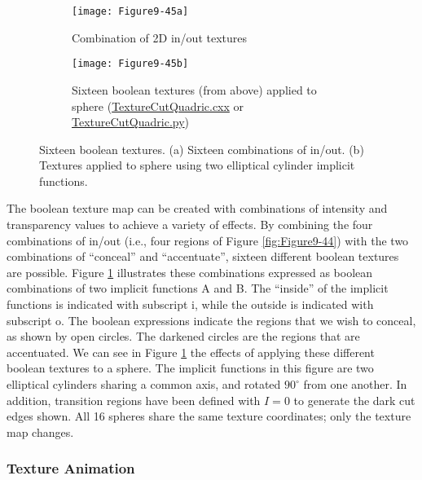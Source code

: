 \begin{figure}[htb]
	\begin{subfigure}[h]{0.75\linewidth}
		\texttt{[image: Figure9-45a]}
		\captionsetup{justification=centering}
		\caption{Combination of 2D in/out textures}
		\label{fig:Figure9-45a}
	\end{subfigure}
	\hfill
	\begin{subfigure}[h]{0.75\linewidth}
		\texttt{[image: Figure9-45b]}
		\captionsetup{justification=centering}
		\caption{Sixteen boolean textures (from above) applied to sphere  (\href{https://lorensen.github.io/VTKExamples/site/Cxx/Texture/TextureCutQuadric/}{TextureCutQuadric.cxx} or \href{https://lorensen.github.io/VTKExamples/site/Python/Texture/TextureCutQuadric/}{TextureCutQuadric.py})}
		\label{fig:Figure9-45b}
	\end{subfigure}
	\caption{Sixteen boolean textures. (a) Sixteen combinations of in/out. (b) Textures applied to sphere using two elliptical cylinder implicit functions.}\label{fig:Figure9-45}
\end{figure}

The boolean texture map can be created with combinations of intensity and transparency values to achieve a variety of effects. By combining the four combinations of in/out (i.e., four regions of Figure \ref{fig:Figure9-44}) with the two combinations of ``conceal'' and ``accentuate'', sixteen different boolean textures are possible. Figure \ref{fig:Figure9-45a} illustrates these combinations expressed as boolean combinations of two implicit functions A and B. The ``inside'' of the implicit functions is indicated with subscript i, while the outside is indicated with subscript o. The boolean expressions indicate the regions that we wish to conceal, as shown by open circles. The darkened circles are the regions that are accentuated. We can see in Figure \ref{fig:Figure9-45a} the effects of applying these different boolean textures to a sphere. The implicit functions in this figure are two elliptical cylinders sharing a common axis, and rotated $90^\circ$ from one another. In addition, transition regions have been defined with $I = 0$ to generate the dark cut edges shown. All 16 spheres share the same texture coordinates; only the texture map changes.

\subsubsection{Texture Animation}

